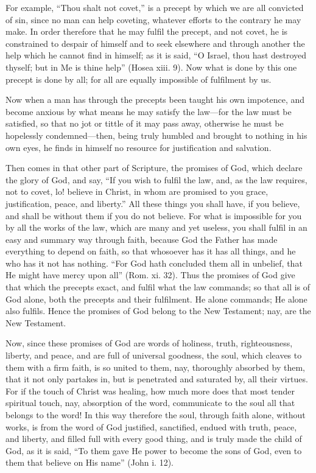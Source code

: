For example, ``Thou shalt not covet,'' is a precept by which we are all
convicted of sin, since no man can help coveting, whatever efforts to the
contrary he may make. In order therefore that he may fulfil the precept,
and not covet, he is constrained to despair of himself and to seek
elsewhere and through another the help which he cannot find in himself; as
it is said, ``O Israel, thou hast destroyed thyself; but in Me is thine
help'' (Hosea xiii. 9). Now what is done by this one precept is done by
all; for all are equally impossible of fulfilment by us.

Now when a man has through the precepts been taught his own impotence, and
become anxious by what means he may satisfy the law—for the law must
be satisfied, so that no jot or tittle of it may pass away, otherwise he
must be hopelessly condemned—then, being truly humbled and brought
to nothing in his own eyes, he finds in himself no resource for
justification and salvation.

Then comes in that other part of Scripture, the promises of God, which
declare the glory of God, and say, ``If you wish to fulfil the law, and, as
the law requires, not to covet, lo! believe in Christ, in whom are
promised to you grace, justification, peace, and liberty.'' All these
things you shall have, if you believe, and shall be without them if you do
not believe. For what is impossible for you by all the works of the law,
which are many and yet useless, you shall fulfil in an easy and summary
way through faith, because God the Father has made everything to depend on
faith, so that whosoever has it has all things, and he who has it not has
nothing. ``For God hath concluded them all in unbelief, that He might have
mercy upon all'' (Rom. xi. 32). Thus the promises of God give that which
the precepts exact, and fulfil what the law commands; so that all is of
God alone, both the precepts and their fulfilment. He alone commands; He
alone also fulfils. Hence the promises of God belong to the New Testament;
nay, are the New Testament.

Now, since these promises of God are words of holiness, truth,
righteousness, liberty, and peace, and are full of universal goodness, the
soul, which cleaves to them with a firm faith, is so united to them, nay,
thoroughly absorbed by them, that it not only partakes in, but is
penetrated and saturated by, all their virtues. For if the touch of Christ
was healing, how much more does that most tender spiritual touch, nay,
absorption of the word, communicate to the soul all that belongs to the
word! In this way therefore the soul, through faith alone, without works,
is from the word of God justified, sanctified, endued with truth, peace,
and liberty, and filled full with every good thing, and is truly made the
child of God, as it is said, ``To them gave He power to become the sons of
God, even to them that believe on His name'' (John i. 12).

